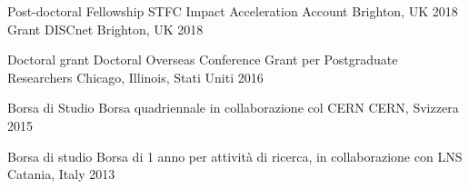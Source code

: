
\begin{cvhonors}
  \cvhonor 
      {Post-doctoral Fellowship}
      {STFC Impact Acceleration Account}
      {Brighton, UK}
      {2018}
  \cvhonor 
      {Grant}
      {DISCnet}
      {Brighton, UK}
      {2018}

  \cvhonor
      {Doctoral grant}
      {Doctoral Overseas Conference Grant per Postgraduate Researchers}
      {Chicago, Illinois, Stati Uniti}
      {2016}

  \cvhonor
      {Borsa di Studio}
      {Borsa quadriennale in collaborazione col CERN}
      {CERN, Svizzera}
      {2015}

  \cvhonor
      {Borsa di studio}
      {Borsa di 1 anno per attività di ricerca, in collaborazione con LNS}
      {Catania, Italy}
      {2013}
\end{cvhonors}